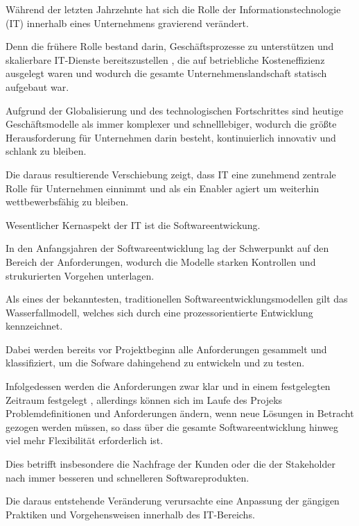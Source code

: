 Während der letzten Jahrzehnte hat sich die Rolle der Informationstechnologie (IT) innerhalb eines Unternehmens gravierend verändert. 

Denn die frühere Rolle bestand darin, Geschäftsprozesse zu unterstützen und skalierbare IT-Dienste bereitszustellen \cite{haffke_transformative_2017}, die auf betriebliche Kosteneffizienz ausgelegt waren und wodurch die gesamte Unternehmenslandschaft statisch aufgebaut war. \cite[S. 16]{ravichandran_devops_2016}

Aufgrund der Globalisierung und des technologischen Fortschrittes sind heutige Geschäftsmodelle als immer komplexer und schnelllebiger, wodurch die größte Herausforderung für Unternehmen darin besteht, kontinuierlich innovativ und schlank zu bleiben. \cite{haffke_transformative_2017}  

Die daraus resultierende Verschiebung zeigt, dass IT eine zunehmend zentrale Rolle für Unternehmen einnimmt und als ein Enabler agiert um weiterhin wettbewerbsfähig zu bleiben. \cite{haffke_transformative_2017} 

Wesentlicher Kernaspekt der IT ist die Softwareentwickung. 

In den Anfangsjahren der Softwareentwicklung lag der Schwerpunkt auf den Bereich der Anforderungen, wodurch die Modelle starken Kontrollen und strukurierten Vorgehen unterlagen. \cite{kneuper_sixty_2017}

Als eines der bekanntesten, traditionellen Softwareentwicklungsmodellen gilt das Wasserfallmodell, welches sich durch eine prozessorientierte Entwicklung kennzeichnet. \cite{bakaji_waterfall_2012} 

Dabei werden bereits vor Projektbeginn alle Anforderungen gesammelt und klassifiziert, um die Sofware dahingehend zu entwickeln und zu testen. 

Infolgedessen werden die Anforderungen zwar klar und in einem festgelegten Zeitraum festgelegt \cite{bakaji_waterfall_2012}, allerdings können sich im Laufe des Projeks Problemdefinitionen und Anforderungen ändern, wenn neue Lösungen in Betracht gezogen werden müssen, so dass über die gesamte Softwareentwicklung hinweg viel mehr Flexibilität erforderlich ist. \cite[S. 17]{ravichandran_devops_2016}

Dies betrifft insbesondere die Nachfrage der Kunden oder die der Stakeholder nach immer besseren und schnelleren Softwareprodukten.

Die daraus entstehende Veränderung verursachte eine Anpassung der gängigen Praktiken und Vorgehensweisen innerhalb des IT-Bereichs. 

